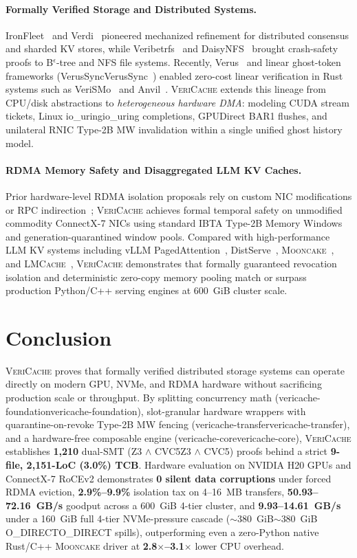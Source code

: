 \documentclass[11pt,a4paper]{article}
\let\origunderscore\_
\DeclareRobustCommand{\code}[1]{{\ttfamily\ifmmode #1\else\def\_{\origunderscore\hspace{0pt}}#1\fi}}
\newcommand{\VC}{\textsc{VeriCache}}
\newcommand{\MC}{\textsc{Mooncake}}
\newcommand{\LM}{\textsc{LMCache}}
\begin{document}
\paragraph{Formally Verified Storage and Distributed Systems.}
IronFleet~\cite{ironfleet} and Verdi~\cite{verdi} pioneered mechanized refinement for distributed consensus and sharded KV stores, while Veribetrfs~\cite{veribetrfs} and DaisyNFS~\cite{daisynfs} brought crash-safety proofs to B$^\epsilon$-tree and NFS file systems. Recently, Verus~\cite{verus} and linear ghost-token frameworks (\code{VerusSync}~\cite{verussync}) enabled zero-cost linear verification in Rust systems such as VeriSMo~\cite{verismo} and Anvil~\cite{anvil}. \VC{} extends this lineage from CPU/disk abstractions to \emph{heterogeneous hardware DMA}: modeling CUDA stream tickets, Linux \code{io\_uring} completions, GPUDirect BAR1 flushes, and unilateral RNIC Type-2B MW invalidation within a single unified ghost history model.

\paragraph{RDMA Memory Safety and Disaggregated LLM KV Caches.}
Prior hardware-level RDMA isolation proposals rely on custom NIC modifications or RPC indirection~\cite{srdma,flock}; \VC{} achieves formal temporal safety on unmodified commodity ConnectX-7 NICs using standard IBTA Type-2B Memory Windows and generation-quarantined window pools. Compared with high-performance LLM KV systems including vLLM PagedAttention~\cite{vllm}, DistServe~\cite{distserve}, \MC{}~\cite{mooncake}, and \LM{}~\cite{lmcache}, \VC{} demonstrates that formally guaranteed revocation isolation and deterministic zero-copy memory pooling match or surpass production Python/C++ serving engines at 600~GiB cluster scale.

\section{Conclusion}
\label{sec:conc}

\VC{} proves that formally verified distributed storage systems can operate directly on modern GPU, NVMe, and RDMA hardware without sacrificing production scale or throughput. By splitting concurrency math (\code{vericache-foundation}), slot-granular hardware wrappers with quarantine-on-revoke Type-2B MW fencing (\code{vericache-transfer}), and a hardware-free composable engine (\code{vericache-core}), \VC{} establishes \textbf{1,210} dual-SMT (\code{Z3 $\wedge$ CVC5}) proofs behind a strict \textbf{9-file, 2,151-LoC (3.0\%) TCB}. Hardware evaluation on NVIDIA H20 GPUs and ConnectX-7 RoCEv2 demonstrates \textbf{0 silent data corruptions} under forced RDMA eviction, \textbf{2.9\%--9.9\%} isolation tax on 4--16~MB transfers, \textbf{50.93--72.16~GB/s} goodput across a 600~GiB 4-tier cluster, and \textbf{9.93--14.61~GB/s} under a 160~GiB full 4-tier NVMe-pressure cascade (\code{$\sim$380~GiB} \code{O\_DIRECT} spills), outperforming even a zero-Python native Rust/C++ \MC{} driver at \textbf{2.8$\times$--3.1$\times$} lower CPU overhead.
\end{document}
